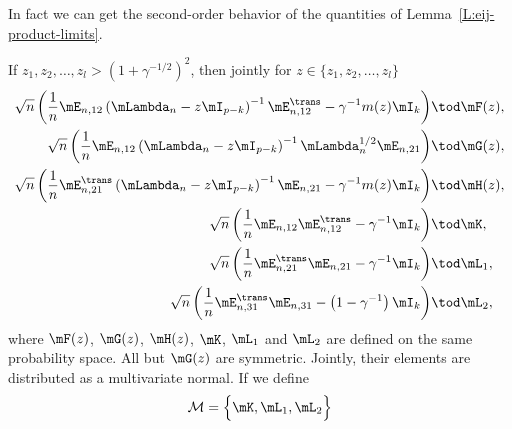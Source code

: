 In fact we can get the second-order behavior of the quantities of Lemma~\ref{L:eij-product-limits}.

\begin{lemma}\label{L:eij-product-scaled-limits}
    If $z_1, z_2, \ldots, z_l > \left( 1 + \gamma^{-1/2} \right)^2$, 
    then jointly for $z \in \{ z_1, z_2, \ldots, z_l \}$
    \begin{align*}
        \sqrt{n}
        \left(
            \frac{1}{n}
            \mE_{n,12}
            \left(
                \mLambda_n
                -
                z
                \mI_{p-k}
            \right)^{-1}
            \mE_{n,12}^\trans
            -
            \gamma^{-1}
            m(z)
            \mI_k
        \right)
            &\tod \mF(z), \\
        \sqrt{n}
        \left(
            \frac{1}{n}
            \mE_{n,12}
            \left(
                \mLambda_n
                -
                z
                \mI_{p-k}
            \right)^{-1}
            \mLambda_{n}^{1/2}
            \mE_{n,21}
        \right)
            &\tod \mG(z), \\
        \sqrt{n}
        \left(
            \frac{1}{n}
            \mE_{n,21}^\trans
            \left(
                \mLambda_n
                -
                z
                \mI_{p-k}
            \right)^{-1}
            \mE_{n,21}
            -
            \gamma^{-1}
            m(z)
            \mI_k
        \right)
            &\tod \mH(z), \\
        \sqrt{n}
        \left(
            \frac{1}{n}
            \mE_{n,12} \mE_{n,12}^\trans
            -
            \gamma^{-1}
            \mI_k
        \right)
            &\tod \mK, \\
        \sqrt{n}
        \left(
            \frac{1}{n}
            \mE_{n,21}^\trans \mE_{n,21}
            -
            \gamma^{-1}
            \mI_k
        \right)
            &\tod \mL_1, \\
        \sqrt{n}
        \left(
            \frac{1}{n}
            \mE_{n,31}^\trans \mE_{n,31}
            -
            \left( 1 - \gamma^{-1} \right)
            \mI_k
        \right)
            &\tod \mL_2,
    \end{align*}
    where $\mF(z)$, $\mG(z)$, $\mH(z)$, $\mK$, $\mL_1$ and $\mL_2$ are 
    defined on the same probability space.  
    All but $\mG(z)$ are symmetric. Jointly, their elements are
    distributed as a multivariate normal.  If we define
    \[
        \mathcal{M}
        =
        \Big\{ \mK, \mL_1, \mL_2 \Big\}
\]
\end{lemma}
